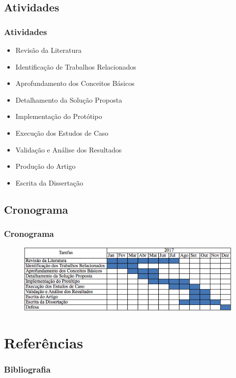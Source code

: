 \documentclass[hyperref={pdfpagelabels=false}]{beamer}
\begin{document}
\subsection{Atividades}
\begin{frame}
	\frametitle{Atividades}
    
    \begin{itemize}
	    \item Revisão da Literatura
        \item Identificação de Trabalhos Relacionados
        \item Aprofundamento dos Conceitos Básicos
        \item Detalhamento da Solução Proposta
        \item Implementação do Protótipo
        \item Execução dos Estudos de Caso
        \item Validação e Análise dos Resultados
        \item Produção do Artigo
        \item Escrita da Dissertação
    \end{itemize}
\end{frame}

\subsection{Cronograma}
\begin{frame}
	\frametitle{Cronograma}
		    \begin{figure}
 		   		\centering
	        	\includegraphics[scale=.6]{img/CronogramaDissertacao.png}
   			\end{figure}
 
\end{frame}


\section {Referências}
\begin{frame}[allowframebreaks]
\frametitle{Bibliografia}
    
    \footnotesize{  }
\end{frame}
\end{document}

